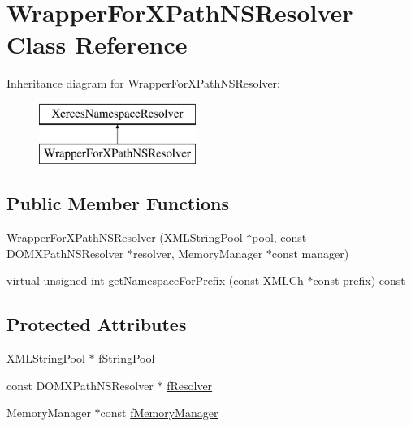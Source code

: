\hypertarget{classWrapperForXPathNSResolver}{\section{Wrapper\-For\-X\-Path\-N\-S\-Resolver Class Reference}
\label{classWrapperForXPathNSResolver}
}
Inheritance diagram for Wrapper\-For\-X\-Path\-N\-S\-Resolver\-:\begin{figure}[H]
\begin{center}
\leavevmode
\includegraphics[height=2.000000cm]{classWrapperForXPathNSResolver}
\end{center}
\end{figure}
\subsection*{Public Member Functions}
\begin{DoxyCompactItemize}
\item 
\hyperlink{classWrapperForXPathNSResolver_ad6544d1eae4c6ffc2fcba72f885e2872}{Wrapper\-For\-X\-Path\-N\-S\-Resolver} (X\-M\-L\-String\-Pool $\ast$pool, const D\-O\-M\-X\-Path\-N\-S\-Resolver $\ast$resolver, Memory\-Manager $\ast$const manager)
\item 
virtual unsigned int \hyperlink{classWrapperForXPathNSResolver_a2b013e936f8a1c7827c709c4172a18c4}{get\-Namespace\-For\-Prefix} (const X\-M\-L\-Ch $\ast$const prefix) const 
\end{DoxyCompactItemize}
\subsection*{Protected Attributes}
\begin{DoxyCompactItemize}
\item 
X\-M\-L\-String\-Pool $\ast$ \hyperlink{classWrapperForXPathNSResolver_aa90e59916249c52dc021f2d2276205b8}{f\-String\-Pool}
\item 
const D\-O\-M\-X\-Path\-N\-S\-Resolver $\ast$ \hyperlink{classWrapperForXPathNSResolver_a19b57e29c83ec35173a3ba86e0bc5388}{f\-Resolver}
\item 
Memory\-Manager $\ast$const \hyperlink{classWrapperForXPathNSResolver_a41f1b5b1d7987561707fe57f04eb3b43}{f\-Memory\-Manager}
\end{DoxyCompactItemize}


